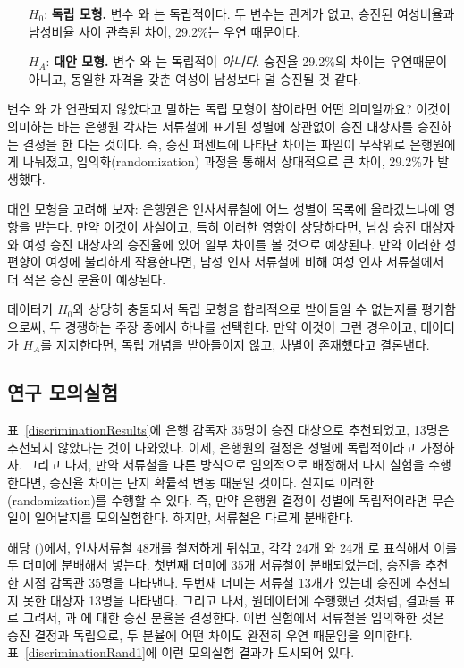 \begin{itemize}
\setlength{\itemsep}{0mm}
\item[$H_0$:] \textbf{독립 모형.} 변수  와 는 독립적이다. 두 변수는 관계가 없고, 승진된 여성비율과 남성비율 사이 관측된 차이, 29.2\%는 우연 때문이다. 
\item[$H_A$:] \textbf{대안 모형.} 변수  와 는 독립적이 \emph{아니다}. 승진율 29.2\%의 차이는 우연때문이 아니고, 동일한 자격을 갖춘 여성이 남성보다 덜 승진될 것 같다.
\end{itemize}

변수  와 가 연관되지 않았다고 말하는 독립 모형이 참이라면 어떤 의미일까요? 이것이 의미하는 바는 은행원 각자는 서류철에 표기된 성별에 상관없이 승진 대상자를 승진하는 결정을 한 다는 것이다. 즉, 승진 퍼센트에 나타난 차이는 파일이 무작위로 은행원에게 나눠졌고, 임의화(randomization) 과정을 통해서 상대적으로 큰 차이, 29.2\%가 발생했다.

대안 모형을 고려해 보자: 은행원은 인사서류철에 어느 성별이 목록에 올라갔느냐에 영향을 받는다. 만약 이것이 사실이고, 특히 이러한 영향이 상당하다면, 남성 승진 대상자와 여성 승진 대상자의 승진율에 있어 일부 차이를 볼 것으로 예상된다. 만약 이러한 성 편향이 여성에 불리하게 작용한다면, 남성 인사 서류철에 비해 여성 인사 서류철에서 더 적은 승진 분율이 예상된다.

데이터가 $H_0$와 상당히 충돌되서 독립 모형을 합리적으로 받아들일 수 없는지를 평가함으로써, 두 경쟁하는 주장 중에서 하나를 선택한다. 만약 이것이 그런 경우이고, 데이터가 $H_A$를 지지한다면, 독립 개념을 받아들이지 않고, 차별이 존재했다고 결론낸다.

\subsection{연구 모의실험}
\label{simulatingTheStudy}


표~\ref{discriminationResults}에 은행 감독자 35명이 승진 대상으로 추천되었고, 13명은 추천되지 않았다는 것이 나와있다. 이제, 은행원의 결정은 성별에 독립적이라고 가정하자. 그리고 나서, 만약 서류철을 다른 방식으로 임의적으로 배정해서 다시 실험을 수행한다면, 승진율 차이는 단지 확률적 변동 때문일 것이다. 실지로 이러한 (randomization)를 수행할 수 있다. 즉, 만약 은행원 결정이 성별에 독립적이라면 무슨 일이 일어날지를 모의실험한다. 하지만, 서류철은 다르게 분배한다.

해당 ()에서, 인사서류철 48개를 철저하게 뒤섞고, 각각 24개  와 24개 로 표식해서 이를 두 더미에 분배해서 넣는다. 첫번째 더미에 35개 서류철이 분배되었는데, 승진을 추천한 지점 감독관 35명을 나타낸다. 두번재 더미는 서류철 13개가 있는데 승진에 추천되지 못한 대상자 13명을 나타낸다. 그리고 나서, 원데이터에 수행했던 것처럼, 결과를 표로 그려서,  과 에 대한 승진 분율을 결정한다. 이번 실험에서 서류철을 임의화한 것은 승진 결정과 독립으로, 두 분율에 어떤 차이도 완전히 우연 때문임을 의미한다. 표~\ref{discriminationRand1}에 이런 모의실험 결과가 도시되어 있다.

